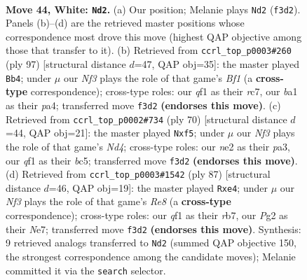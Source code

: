 \documentclass[11pt]{article}
\begin{document}
\clearpage

\begin{figure}[p]\centering
\begin{subfigure}{0.46\textwidth}\centering
\resizebox{\linewidth}{!}{%
\newchessgame
\chessboard[
  setfen={7k/1p3p2/6p1/p7/P6p/5N1P/4n1PK/b4q2 w - - 1 44},
  showmover=false,
  pgfstyle=straightmove, color=movearrow, markmove={f3-d2}
]}
\caption{}
\end{subfigure}\hfill
\begin{subfigure}{0.46\textwidth}\centering
\resizebox{\linewidth}{!}{%
\newchessgame
\chessboard[
  setfen={5b2/2R2n1p/4k1pP/5p2/P2B1P2/1p2P3/8/1K6 b - - 0 49},
  showmover=false,
  pgfstyle=straightmove, color=movearrow, markmove={f8-b4}
]}
\caption{}
\end{subfigure}
\\[4pt]
\begin{subfigure}{0.46\textwidth}\centering
\resizebox{\linewidth}{!}{%
\newchessgame
\chessboard[
  setfen={1k6/7p/2p5/2b2p2/2PN4/p1K3P1/5P1P/8 w - - 0 36},
  showmover=false,
  pgfstyle=straightmove, color=movearrow, markmove={d4-f5}
]}
\caption{}
\end{subfigure}\hfill
\begin{subfigure}{0.46\textwidth}\centering
\resizebox{\linewidth}{!}{%
\newchessgame
\chessboard[
  setfen={5k2/1R2n2p/4B1p1/2K1p3/4Pp1P/2P5/6P1/4r3 b - - 7 44},
  showmover=false,
  pgfstyle=straightmove, color=movearrow, markmove={e1-e4}
]}
\caption{}
\end{subfigure}
\caption{\textbf{Move 44, White: \texttt{Nd2}.} (a) Our position; Melanie plays \texttt{Nd2} (\texttt{f3d2}). Panels (b)--(d) are the retrieved master positions whose correspondence most drove this move (highest QAP objective among those that transfer to it). (b) Retrieved from \texttt{ccrl\_top\_p0003\#260} (ply 97) [structural distance $d$=47, QAP obj=35]: the master played \texttt{Bb4}; under $\mu$ our \emph{Nf3} plays the role of that game's \emph{Bf1} (a \textbf{cross-type} correspondence); cross-type roles: our \emph{q}f1 as their \emph{r}c7, our \emph{b}a1 as their \emph{p}a4; transferred move \texttt{f3d2} \textbf{(endorses this move)}. (c) Retrieved from \texttt{ccrl\_top\_p0002\#734} (ply 70) [structural distance $d$=44, QAP obj=21]: the master played \texttt{Nxf5}; under $\mu$ our \emph{Nf3} plays the role of that game's \emph{Nd4}; cross-type roles: our \emph{n}e2 as their \emph{p}a3, our \emph{q}f1 as their \emph{b}c5; transferred move \texttt{f3d2} \textbf{(endorses this move)}. (d) Retrieved from \texttt{ccrl\_top\_p0003\#1542} (ply 87) [structural distance $d$=46, QAP obj=19]: the master played \texttt{Rxe4}; under $\mu$ our \emph{Nf3} plays the role of that game's \emph{Re8} (a \textbf{cross-type} correspondence); cross-type roles: our \emph{q}f1 as their \emph{r}b7, our \emph{P}g2 as their \emph{N}e7; transferred move \texttt{f3d2} \textbf{(endorses this move)}. Synthesis: 9 retrieved analogs transferred to \texttt{Nd2} (summed QAP objective 150, the strongest correspondence among the candidate moves); Melanie committed it via the \texttt{search} selector.}
\label{fig:thought-m86}
\end{figure}
\end{document}
